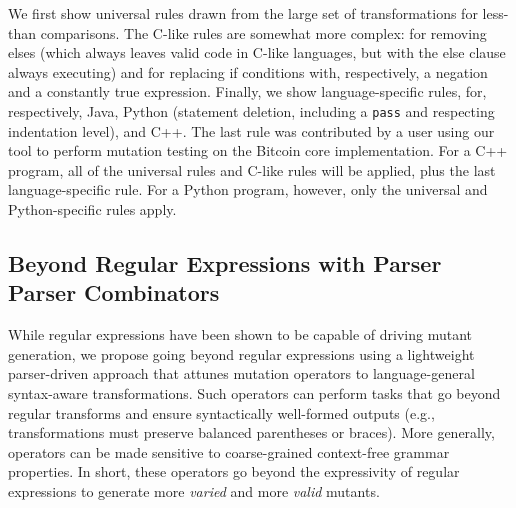 \documentclass[acmsmall,screen,review,anonymous]{acmart}
\begin{document}
{We first show universal rules drawn from the large set of transformations for
less-than comparisons.  The C-like rules are somewhat more
complex: for removing elses (which always leaves valid code in
C-like languages, but with the else clause always executing) and for
replacing if conditions with, respectively, a negation and a
constantly true expression.  Finally, we show
language-specific rules, for, respectively, Java, Python (statement
deletion, including a {\tt pass} and respecting indentation level),
and C++.  The last rule was contributed by a user using our tool to
perform mutation testing on the Bitcoin core implementation.  For a
C++ program, all of the universal rules and C-like rules will be
applied, plus the last language-specific rule.  For a Python
program, however, only the universal and Python-specific rules apply.


\subsection{Beyond Regular Expressions with Parser Parser Combinators}




While regular expressions have been shown to be capable of driving mutant generation, we
propose going beyond regular expressions using a lightweight
parser-driven approach that attunes mutation operators to
language-general syntax-aware transformations. Such operators can
perform tasks that go beyond regular transforms and ensure
syntactically well-formed outputs (e.g., transformations must preserve
balanced parentheses or braces). More generally, operators can be made
sensitive to coarse-grained context-free grammar properties. In short,
these
operators go beyond the expressivity of regular expressions to generate more
\emph{varied} and more \emph{valid} mutants.

}
\end{document}
